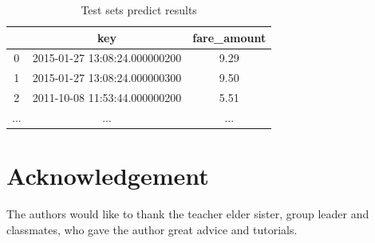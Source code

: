 \begin{table}[htbp]  
\centering
  \begin{center}
  \begin{tabular}{ccc}
\toprule
    & key & fare\_amount \\
\midrule
    0 & 2015-01-27 13:08:24.000000200 & 9.29 \\
    1 & 2015-01-27 13:08:24.000000300 & 9.50 \\
    2 & 2011-10-08 11:53:44.000000200 & 5.51 \\
    ... & ... &... \\
\bottomrule
\end{tabular}
\end{center}
\caption{Test sets predict results}
\end{table}









\newpage
\section*{Acknowledgement}


The authors would like to thank the teacher elder sister, group leader and classmates, who gave the author great advice and tutorials.


